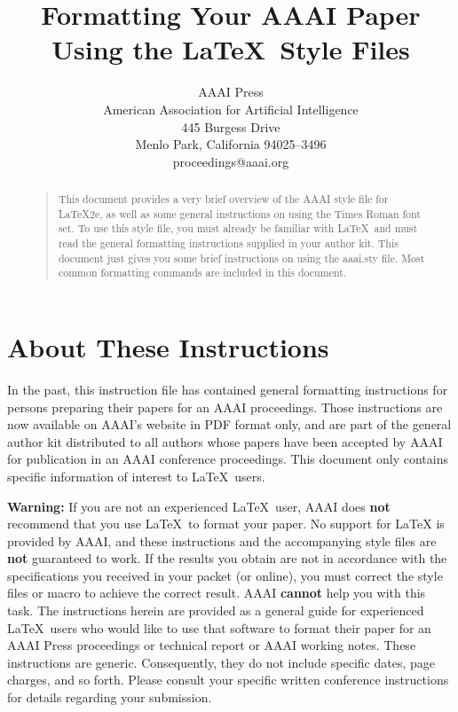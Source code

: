 \documentclass[letterpaper]{article}
\begin{document}
%
\title{Formatting Your AAAI Paper Using the \LaTeX\ Style Files}
\author{AAAI Press\\
American Association for Artificial Intelligence\\
445 Burgess Drive\\
Menlo Park, California 94025--3496\\
proceedings@aaai.org}
\maketitle
\begin{abstract}
\begin{quote}
This document provides a very brief overview of the AAAI style file
for \LaTeX2e, as well as some general instructions on using the 
Times Roman font set. To use this style file, you must already
be familiar with \LaTeX\ and must read the general formatting 
instructions supplied in your author kit. This document just gives you some 
brief instructions on using the 
aaai.sty file. Most common formatting commands are included in this document.
\end{quote}
\end{abstract}

\section{About These Instructions}

In the past, this instruction file has contained general formatting instructions
for persons preparing their papers for an AAAI proceedings. Those instructions
are now available on AAAI's website in PDF format only, and are part of the
general author kit distributed to all authors whose papers have been accepted by
AAAI for publication in an AAAI conference proceedings. This document only
contains specific information of interest to \LaTeX\ users. 

{\bf Warning:} If you are not an experienced \LaTeX\ user, AAAI does {\bf not}
recommend that you use \LaTeX\ to format your paper. No support for LaTeX is
provided by AAAI, and these instructions and the accompanying style files are {\bf
not} guaranteed to work. If the results you obtain are not in accordance with the 
specifications you received in your packet (or online), you must correct the style
files or macro to achieve the correct result. AAAI {\bf cannot} help you with this
task.  The instructions herein are provided as a general guide for experienced
\LaTeX\ users who would like to use that software to format their paper for an
AAAI Press proceedings or technical report or AAAI working notes. These
instructions are generic. Consequently, they do not include specific dates, page
charges, and so forth. Please consult your specific written conference
instructions for details regarding your submission.
\end{document}
